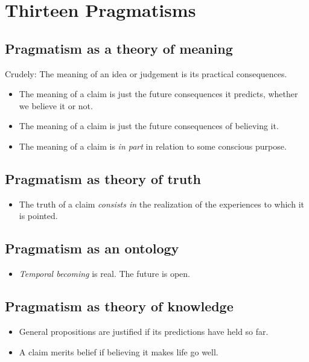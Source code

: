 \documentclass[10pt]{article}
\begin{document}
\pagestyle{empty}
\section{Thirteen Pragmatisms}

\subsection{Pragmatism as a theory of meaning}
Crudely: The meaning of an idea or judgement is its practical consequences.


\begin{itemize}
\item The meaning of a claim is just the future consequences it predicts, whether we believe it or not. \marginpar{[1]}

\item The meaning of a claim is just the future consequences of believing it. \marginpar{[2]}

\item The meaning of a claim is \emph{in part} in relation to some conscious purpose. \marginpar{[13]}

\end{itemize}


\subsection{Pragmatism as theory of truth}
\begin{itemize}
\item The truth of a claim \emph{consists in} the realization of the experiences to which it is pointed. \marginpar{[3]}
\end{itemize}


\subsection{Pragmatism as an ontology}
\marginpar{[6]}

\begin{itemize}
\item \emph{Temporal becoming} is real. The future is open.
\end{itemize}


\subsection{Pragmatism as theory of knowledge}
\begin{itemize}
\item General propositions are justified if its predictions have held so far. \marginpar{[4]}


\item A claim merits belief if believing it makes life go well. \marginpar{[5]}
\end{itemize}
\end{document}
